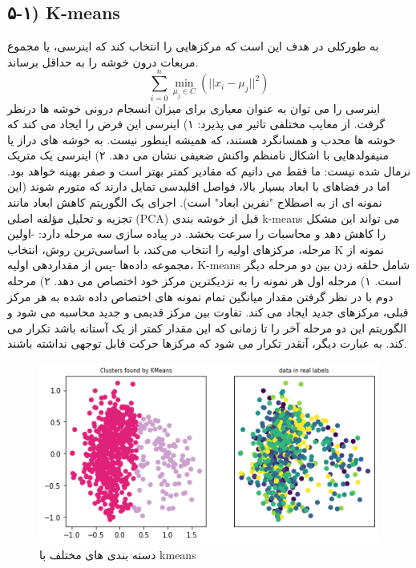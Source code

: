 \documentclass{article}
\begin{document}
\subsection{۵-۱) K-means}
به طورکلی در  هدف این است که مرکزهایی را انتخاب کند که اینرسی، یا مجموع مربعات درون خوشه را به حداقل برساند.
\begin{equation}
	\sum_{i=0}^{n}\min_{\mu_j \in C}(||x_i - \mu_j||^2)
\end{equation}
اینرسی را می توان به عنوان معیاری برای میزان انسجام درونی خوشه ها درنظر گرفت. از معایب مختلفی تاثیر می پذیرد: \newline
۱) اینرسی این فرض را ایجاد می کند که خوشه ها محدب و همسانگرد هستند، که همیشه اینطور نیست. به خوشه های دراز یا منیفولدهایی با اشکال نامنظم واکنش ضعیفی نشان می دهد. \newline
۲) اینرسی یک متریک نرمال شده نیست: ما فقط می دانیم که مقادیر کمتر بهتر است و صفر بهینه خواهد بود. اما در فضاهای با ابعاد بسیار بالا، فواصل اقلیدسی تمایل دارند که متورم شوند (این نمونه ای از به اصطلاح "نفرین ابعاد" است). اجرای یک الگوریتم کاهش ابعاد مانند تجزیه و تحلیل مؤلفه اصلی (PCA) قبل از خوشه بندی k-means می تواند این مشکل را کاهش دهد و محاسبات را سرعت بخشد. \newline
در پیاده سازی  سه مرحله دارد:\newline
-اولین مرحله، مرکزهای اولیه را انتخاب می‌کند، با اساسی‌ترین روش، انتخاب K نمونه از مجموعه داده‌ها\newline
-پس از مقداردهی اولیه، K-means شامل حلقه زدن بین دو مرحله دیگر است.\newline
۱) مرحله اول هر نمونه را به نزدیکترین مرکز خود اختصاص می دهد.\newline
۲) مرحله دوم با در نظر گرفتن مقدار میانگین تمام نمونه های اختصاص داده شده به هر مرکز قبلی، مرکزهای جدید ایجاد می کند. تفاوت بین مرکز قدیمی و جدید محاسبه می شود و الگوریتم این دو مرحله آخر را تا زمانی که این مقدار کمتر از یک آستانه باشد تکرار می کند. به عبارت دیگر، آنقدر تکرار می شود که مرکزها حرکت قابل توجهی نداشته باشند.\newline
\begin{figure}[h]
	\centering
	\includegraphics[width=0.5\linewidth]{Photo/download2}
	\caption[دسته بندی های مختلف با kmeans]{دسته بندی های مختلف با kmeans}
	\label{fig:download2}
\end{figure}
\end{document}
